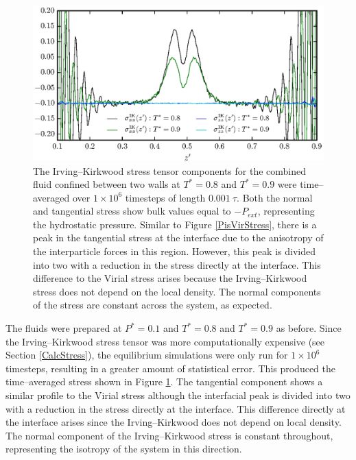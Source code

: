 \begin{figure}[h!]
\centering
\includegraphics[scale=1.0]{PisIKStress}
\caption{The Irving--Kirkwood stress tensor components for the combined fluid confined between two walls at $T^{*} = 0.8$ and $T^{*} = 0.9$ were time--averaged over $1 \times 10^{6}$ timesteps of length $0.001\ \tau$.
Both the normal and tangential stress show bulk values equal to $-P_{ext}$, representing the hydrostatic pressure.
Similar to Figure \ref{PisVirStress}, there is a peak in the tangential stress at the interface due to the anisotropy of the interparticle forces in this region.
However, this peak is divided into two with a reduction in the stress directly at the interface.
This difference to the Virial stress arises because the Irving--Kirkwood stress does not depend on the local density. 
The normal components of the stress are constant across the system, as expected.
}
\label{PisIKStress}
\end{figure}
\FloatBarrier 
The fluids were prepared at $P^{*}=0.1$ and $T^{*}=0.8$ and $T^{*}=0.9$ as before.
Since the Irving--Kirkwood stress tensor was more computationally expensive (see Section \ref{CalcStress}), the equilibrium simulations were only run for $1 \times 10^{6}$ timesteps, resulting in a greater amount of statistical error.
This produced the time--averaged stress shown in Figure \ref{PisIKStress}.
The tangential component shows a similar profile to the Virial stress although the interfacial peak is divided into two with a reduction in the stress directly at the interface.
This difference directly at the interface arises since the Irving--Kirkwood does not depend on local density.
The normal component of the Irving--Kirkwood stress is constant throughout, representing the isotropy of the system in this direction.
\FloatBarrier

